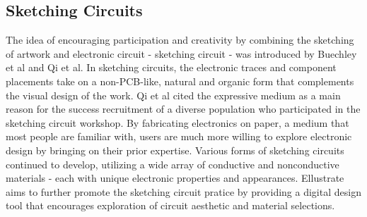 \documentclass{sigchi}
\begin{document}


\subsection{Sketching Circuits}
The idea of encouraging participation and creativity by combining the sketching of artwork and electronic circuit - sketching circuit - was introduced by Buechley et al and Qi et al. In sketching circuits, the electronic traces and component placements take on a non-PCB-like, natural and organic form that complements the visual design of the work. Qi et al cited the expressive medium as a main reason for the success recruitment of a diverse population who participated in the sketching circuit workshop. By fabricating electronics on paper, a medium that most people are familiar with, users are much more willing to explore electronic design by bringing on their prior expertise. Various forms of sketching circuits continued to develop, utilizing a wide array of conductive and nonconductive materials - each with unique electronic properties and appearances. Ellustrate aims to further promote the sketching circuit pratice by providing a digital design tool that encourages exploration of circuit aesthetic and material selections.

\end{document}
